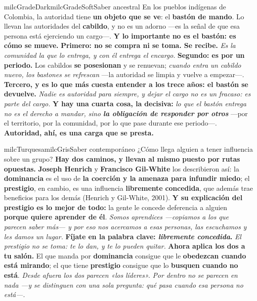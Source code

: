 \documentclass[11pt,letterpaper]{article}
\begin{document}
\begin{softbox}{milcGradeDark}{milcGradeSoft}{Saber ancestral}
En los pueblos indígenas de Colombia, la autoridad tiene \textbf{un objeto que se ve}: el \textbf{bastón de mando}. Lo llevan las autoridades del \textbf{cabildo}, y no es un adorno ---es la señal de que esa persona está ejerciendo un cargo---. \textbf{Y lo importante no es el bastón: es cómo se mueve.} \textbf{Primero: no se compra ni se toma. Se recibe.} \emph{Es la comunidad la que lo entrega, y con él entrega el encargo.} \textbf{Segundo: es por un periodo.} Los cabildos \textbf{se posesionan} y se renuevan; \emph{cuando entra un cabildo nuevo, los bastones se refrescan} ---la autoridad se limpia y vuelve a empezar---. \textbf{Tercero, y es lo que más cuesta entender a los trece años: el bastón se devuelve.} \emph{Nadie es autoridad para siempre, y dejar el cargo no es un fracaso: es parte del cargo.} \textbf{Y hay una cuarta cosa, la decisiva:} \emph{lo que el bastón entrega no es el derecho a mandar, sino \textbf{la obligación de responder por otros}} ---por el territorio, por la comunidad, por lo que pase durante ese periodo---. \textbf{Autoridad, ahí, es una carga que se presta.}
\end{softbox}

\begin{softbox}{milcTurquesa}{milcGris}{Saber contemporáneo}
¿Cómo llega alguien a tener influencia sobre un grupo? \textbf{Hay dos caminos, y llevan al mismo puesto por rutas opuestas.} \textbf{Joseph Henrich} y \textbf{Francisco Gil-White} los describieron así: la \textbf{dominancia} es el uso de \textbf{la coerción y la amenaza para infundir miedo}; el \textbf{prestigio}, en cambio, es una influencia \textbf{libremente concedida}, que además trae beneficios para los demás (Henrich y Gil-White, 2001). \textbf{Y su explicación del prestigio es lo mejor de todo:} la gente le concede deferencia a alguien \textbf{porque quiere aprender de él}. \emph{Somos aprendices ---copiamos a los que parecen saber más--- y por eso nos acercamos a esas personas, las escuchamos y les damos un lugar.} \textbf{Fíjate en la palabra clave: \emph{libremente concedida}.} \emph{El prestigio no se toma: te lo dan, y te lo pueden quitar.} \textbf{Ahora aplica los dos a tu salón.} El que manda por \textbf{dominancia} consigue que le \textbf{obedezcan cuando está mirando}; el que tiene \textbf{prestigio} consigue que lo \textbf{busquen cuando no está}. \emph{Desde afuera los dos parecen «los líderes». Por dentro no se parecen en nada ---y se distinguen con una sola pregunta: qué pasa cuando esa persona no está---.}
\end{softbox}
\end{document}

